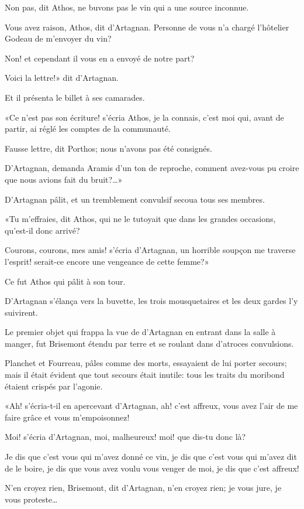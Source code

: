 \speak  Non pas, dit Athos, ne buvons pas le vin qui a une source inconnue. 

\speak  Vous avez raison, Athos, dit d'Artagnan. Personne de vous n'a chargé l'hôtelier Godeau de m'envoyer du vin? 

\speak  Non! et cependant il vous en a envoyé de notre part? 

\speak  Voici la lettre!» dit d'Artagnan. 

Et il présenta le billet à ses camarades. 

«Ce n'est pas son écriture! s'écria Athos, je la connais, c'est moi qui, avant de partir, ai réglé les comptes de la communauté. 

\speak  Fausse lettre, dit Porthos; nous n'avons pas été consignés. 

\speak  D'Artagnan, demanda Aramis d'un ton de reproche, comment avez-vous pu croire que nous avions fait du bruit?\dots» 

D'Artagnan pâlit, et un tremblement convulsif secoua tous ses membres. 

«Tu m'effraies, dit Athos, qui ne le tutoyait que dans les grandes occasions, qu'est-il donc arrivé? 

\speak  Courons, courons, mes amis! s'écria d'Artagnan, un horrible soupçon me traverse l'esprit! serait-ce encore une vengeance de cette femme?» 

Ce fut Athos qui pâlit à son tour. 

D'Artagnan s'élança vers la buvette, les trois mousquetaires et les deux gardes l'y suivirent. 

Le premier objet qui frappa la vue de d'Artagnan en entrant dans la salle à manger, fut Brisemont étendu par terre et se roulant dans d'atroces convulsions. 

Planchet et Fourreau, pâles comme des morts, essayaient de lui porter secours; mais il était évident que tout secours était inutile: tous les traits du moribond étaient crispés par l'agonie. 

«Ah! s'écria-t-il en apercevant d'Artagnan, ah! c'est affreux, vous avez l'air de me faire grâce et vous m'empoisonnez! 

\speak  Moi! s'écria d'Artagnan, moi, malheureux! moi! que dis-tu donc là? 

\speak  Je dis que c'est vous qui m'avez donné ce vin, je dis que c'est vous qui m'avez dit de le boire, je dis que vous avez voulu vous venger de moi, je dis que c'est affreux! 

\speak  N'en croyez rien, Brisemont, dit d'Artagnan, n'en croyez rien; je vous jure, je vous proteste\dots 

